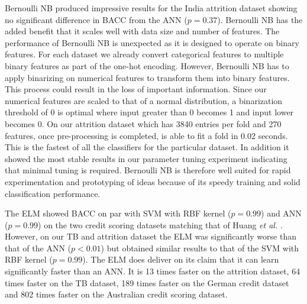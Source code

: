 \documentclass{sig-alternate-05-2015}
\begin{document}
	Bernoulli NB produced impressive results for the India attrition dataset showing no significant difference in BACC from the ANN ($p=0.37$). Bernoulli NB has the added benefit that it scales well with data size and number of features. The performance of Bernoulli NB is unexpected as it is designed to operate on binary features. For each dataset we already convert categorical features to multiple binary features as part of the one-hot encoding. However, Bernoulli NB has to apply binarizing on numerical features to transform them into binary features. This process could result in the loss of important information. Since our numerical features are scaled to that of a normal distribution, a binarization threshold of 0 is optimal where input greater than 0 becomes 1 and input lower becomes 0. On our attrition dataset which has 3840 entries per fold and 270 features, once pre-processing is completed, is able to fit a fold in 0.02 seconds. This is the fastest of all the classifiers for the particular dataset. In addition it showed the most stable results in our parameter tuning experiment indicating that minimal tuning is required. Bernoulli NB is therefore well suited for rapid experimentation and prototyping of ideas because of its speedy training and solid classification performance.

	The ELM showed BACC on par with SVM with RBF kernel ($p=0.99$) and ANN ($p=0.99$) on the two credit scoring datasets matching that of Huang \textit{et al.} \cite{6035797, Huang2006489}. However, on our TB and attrition dataset the ELM was significantly worse than that of the ANN ($p<0.01$) but obtained similar results to that of the SVM with RBF kernel ($p=0.99$). The ELM does deliver on its claim that it can learn significantly faster than an ANN. It is 13 times faster on the attrition dataset, 64 times faster on the TB dataset, 189 times faster on the German credit dataset and 802 times faster on the Australian credit scoring dataset.
	
\end{document}
